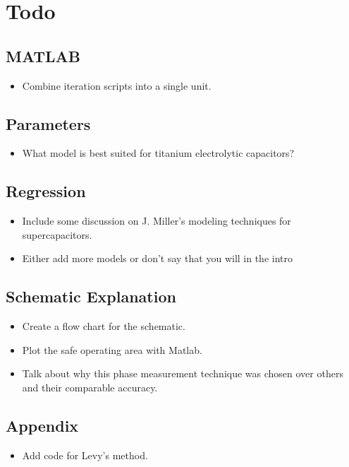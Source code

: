 \section{Todo}

\subsection{MATLAB}
\begin{itemize}
    \item Combine iteration scripts into a single unit.
\end{itemize}

\subsection{Parameters}
\begin{itemize}
    \item What model is best suited for titanium electrolytic capacitors?
\end{itemize}

\subsection{Regression}
\begin{itemize}
    \item Include some discussion on J. Miller's modeling techniques for supercapacitors.
    \item Either add more models or don't say that you will in the intro
\end{itemize}

\subsection{Schematic Explanation}
\begin{itemize}
    \item Create a flow chart for the schematic.
    \item Plot the safe operating area with Matlab.
    \item Talk about why this phase measurement technique was chosen over others and their comparable accuracy.
\end{itemize}

\subsection{Appendix}
\begin{itemize}
    \item Add code for Levy's method.
\end{itemize}


